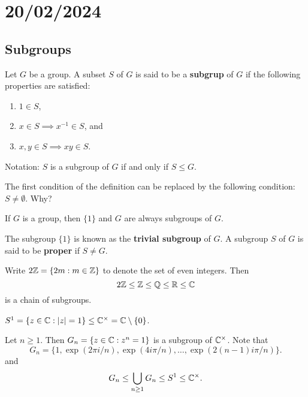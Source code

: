 \section{20/02/2024}

\subsection{Subgroups}

\begin{definition}
    Let $G$ be a group. 
        A subset $S$ of $G$ is said to be a \textbf{subgrup} of $G$ 
        if the following properties are satisfied:
        \begin{enumerate}
                \item $1\in S$,
                \item $x\in S\implies x^{-1}\in S$, and 
                \item $x,y\in S\implies xy\in S$.
        \end{enumerate}
        Notation: $S$ is a subgroup of $G$ if and only if $S\leq G$.
\end{definition}

The first condition of the definition can be replaced by
the following condition: $S\ne\emptyset$. Why? 

\begin{example}
    If $G$ is a group, then 
    $\{1\}$ and $G$ are always subgroups of $G$. 
\end{example}

The subgroup $\{1\}$ is known as the \textbf{trivial subgroup} of $G$. 
A subgroup $S$ of $G$ is said to be \textbf{proper} if $S\ne G$. 

\begin{example}
Write $2\mathbb{Z}=\{2m:m\in\mathbb{Z}\}$ to denote the set of even integers. Then 
\[
2\mathbb{Z}\leq\mathbb{Z}\leq\mathbb{Q}\leq\mathbb{R}\leq\mathbb{C}
\]
is a chain of subgroups. 
\end{example}

\begin{example}
$S^1=\{z\in\mathbb{C}:|z|=1\}\leq\mathbb{C}^\times=\mathbb{C}\setminus\{0\}$.
\end{example}

\begin{example}
Let $n\geq1$. Then $G_n=\{z\in\mathbb{C}:z^
n=1\}$ is a subgroup of $\mathbb{C}^\times$. 
Note that
\[
G_n=\{1,\exp(2\pi i/n),\exp(4i\pi/n),\dots,\exp(2(n-1)i\pi/n)\}.
\]
and 
\[
G_n\leq\bigcup_{n\geq1}G_n\leq S^1\leq\mathbb{C}^\times.
\]
\end{example}

